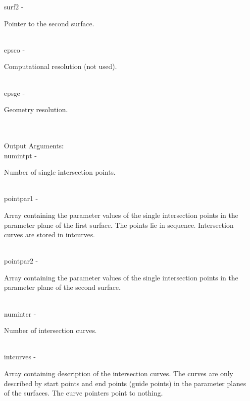         \>\>    {\fov surf2}\> - \>     \begin{minipg2}
                                Pointer to the second surface.
                                \end{minipg2}\\
        \>\>    {\fov epsco}\> - \>     \begin{minipg2}
                                Computational resolution (not used).
                                \end{minipg2}\\
        \>\>    {\fov epsge}\> - \>     \begin{minipg2}
                                Geometry resolution.
                                \end{minipg2} \\
\\
        \>Output Arguments:\\
        \>\>    {\fov numintpt}\> - \>  \begin{minipg2}
                                Number of single intersection points.
                                \end{minipg2}\\
        \>\>    {\fov pointpar1}\> - \>\begin{minipg2}
                                Array containing the parameter values of the single
                                intersection points in the parameter plane of the
                                first surface. The points lie in sequence. Intersection
                                curves are stored in intcurves.
                                \end{minipg2}\\[0.8ex]
        \>\>    {\fov pointpar2}\> - \>\begin{minipg2}
                                Array containing the parameter values of the single
                                intersection points in the parameter plane of the
                                second surface.
                                \end{minipg2}\\[0.8ex]
        \>\>    {\fov numintcr}\> - \>  \begin{minipg2}
                                Number of intersection curves.
                                \end{minipg2}\\
        \>\>    {\fov intcurves}\> - \>\begin{minipg2}
                                Array containing description of the intersection
                                curves. The curves are only described
                                by start points and end points (guide
                                points) in
                                the parameter planes of the surfaces.
                                The curve pointers point to
                                nothing.
                                \end{minipg2}\\[0.3ex]
